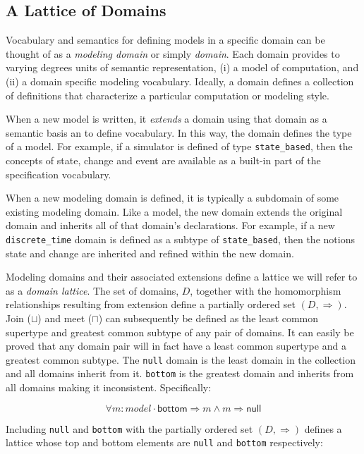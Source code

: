 \documentclass[12pt]{article}
\begin{document}
\subsection{A Lattice of Domains}

Vocabulary and semantics for defining models in a specific domain can be thought of as a
\emph{modeling domain} or simply \emph{domain}.  Each domain provides to varying degrees
units of semantic representation, (i) a model of computation, and (ii) a domain specific
modeling vocabulary.  Ideally, a domain defines a collection of definitions that
characterize a particular computation or modeling style.

When a new model is written, it \emph{extends} a domain using that domain as a semantic
basis an to define vocabulary.  In this way, the domain defines the type of a model.  For
example, if a simulator is defined of type \lstinline!state_based!, then the concepts of
state, change and event are available as a built-in part of the specification vocabulary.

When a new modeling domain is defined, it is typically a subdomain of some existing
modeling domain.  Like a model, the new domain extends the original domain and inherits
all of that domain's declarations.  For example, if a new \lstinline!discrete_time! domain
is defined as a subtype of \lstinline!state_based!, then the notions state and change are
inherited and refined within the new domain.

Modeling domains and their associated extensions define a lattice we will refer to as a
\emph{domain lattice}.  The set of domains, $D$, together with the homomorphism
relationships resulting from extension define a partially ordered set $(D,\Rightarrow)$.
Join ($\sqcup$) and meet ($\sqcap$) can subsequently be defined as the least common
supertype and greatest common subtype of any pair of domains.  It can easily be proved
that any domain pair will in fact have a least common supertype and a greatest common
subtype.  The \lstinline!null! domain is the least domain in the collection and all
domains inherit from it.  \lstinline!bottom! is the greatest domain and inherits from all
domains making it inconsistent.  Specifically:

\[\forall m:model \cdot \mathsf{bottom} \Rightarrow m \wedge m \Rightarrow \mathsf{null}\]

\noindent
Including \lstinline!null! and \lstinline!bottom! with the partially ordered set
$(D,\Rightarrow)$ defines a lattice whose top and bottom elements are \lstinline!null! and
\lstinline!bottom! respectively:
\end{document}
